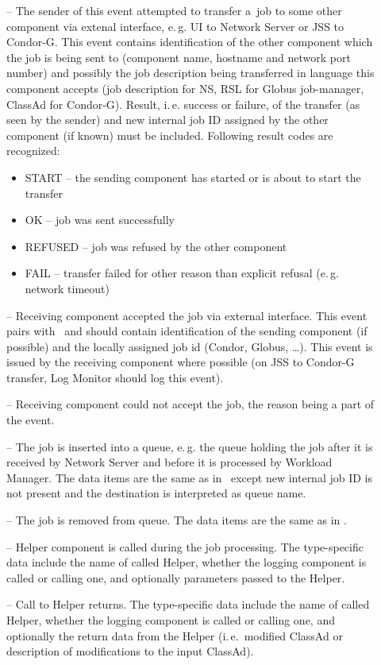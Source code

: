 \documentclass{egee}
\def\ie{i.\,e.\xspace}
\def\eg{e.\,g.\xspace}
\begin{document}
\begin{description}

\item[\jobtransfer] -- The sender of this event attempted to transfer a~job
to some other component via extenal interface, \eg UI to Network Server or JSS to Condor-G.
This event contains identification of the
other component which the job is being sent to (component name, hostname and network port number) and possibly the job
description being transferred in language this component accepts (job description for NS, RSL
for Globus job-manager, ClassAd for Condor-G).
Result, \ie{} success or failure, of the transfer (as seen by the sender)
and new internal job ID assigned by the other component (if known) must be included. Following result codes are recognized:
\begin{itemize}
\item START -- the sending component has started or is about to start the transfer
\item OK -- job was sent successfully
\item REFUSED -- job was refused by the other component
\item FAIL -- transfer failed for other reason than explicit refusal (\eg network timeout)
\end{itemize}

\item[\jobaccepted] -- Receiving component accepted the job via external interface. This
event pairs with \jobtransfer\ and should contain identification of the sending component (if possible) and the locally assigned job id (Condor, Globus, \dots).
This event is issued by the receiving component where possible (on JSS to Condor-G transfer, Log Monitor should log this event).

\item[\jobrefused] -- Receiving component could not accept the job, the reason being a part of the event. 

\item[\jobenqueue] -- The job is inserted into a queue, \eg the queue holding the job after it is received by Network Server and before it is processed by Workload Manager. The data items are the same as in \jobtransfer\ except new internal job ID is not present and the destination is interpreted as queue name.

\item[\jobdequeue] -- The job is removed from queue. The data items are the same as in \jobaccepted.

\item[\helpercall] -- Helper component is called during the job processing. The type-specific data include
the name of called Helper, whether the logging component is called or calling one, and optionally parameters
passed to the Helper.

\item[\helperret] -- Call to Helper returns.  The type-specific data include
the name of called Helper, whether the logging component is called or calling one, and optionally 
the return data from the Helper (\ie\ modified ClassAd or description of modifications to the input ClassAd).
\end{description}
\end{document}
